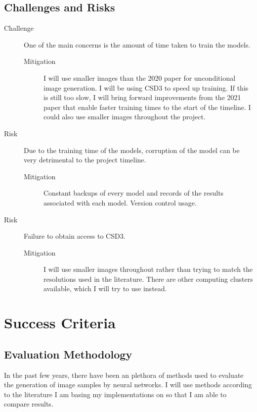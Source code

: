 \documentclass{article}
\begin{document}
\subsection{Challenges and Risks}

\begin{description}
\item[Challenge] One of the main concerns is the amount of time taken to train the models.
\begin{description}
\item[Mitigation] I will use smaller images than the 2020 paper for unconditional image generation. I will be using CSD3 to speed up training. If this is still too slow, I will bring forward improvements from the 2021 paper that enable faster training times to the start of the timeline. I could also use smaller images throughout the project.
\end{description}
\item[Risk] Due to the training time of the models, corruption of the model can be very detrimental to the project timeline.
\begin{description}
\item[Mitigation] Constant backups of every model and records of the results associated with each model. Version control usage.
\end{description}
\item[Risk] Failure to obtain access to CSD3.
\begin{description}
\item[Mitigation] I will use smaller images throughout rather than trying to match the resolutions used in the literature. There are other computing clusters available, which I will try to use instead.
\end{description}
\end{description}

\section{Success Criteria}

\subsection{Evaluation Methodology}

In the past few years, there have been an plethora of methods used to evaluate the generation of image samples by neural networks. I will use methods according to the literature I am basing my implementations on so that I am able to compare results.
\end{document}
